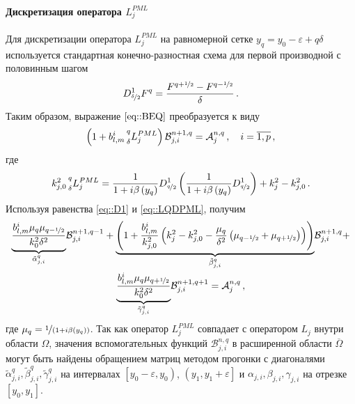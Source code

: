 \documentclass[../document.tex]{subfiles}
\begin{document}
                \paragraph{Дискретизация оператора $L_j^{PML}$}
                    \par Для дискретизации оператора $L_j^{PML}$ на равномерной сетке $y_q=y_0-\varepsilon+q\delta$ используется стандартная конечно-разностная схема для первой производной с половинным шагом
                    \begin{equation}\label{eq::D1}
                        D^1_{\nicefrac{\delta}{2}}F^q=\frac{F^{q+\nicefrac{1}{2}}-F^{q-\nicefrac{1}{2}}}{\delta}\,.
                    \end{equation}
                    Таким образом, выражение $\eqref{eq::BEQ}$ преобразуется к виду 
                    \begin{equation}
                        \left(1+b_{l,m}^i\prescript{q}{\delta}{L_j^{PML}}\right)\mathcal{B}_{j,i}^{n+1,q}=\mathcal{A}_j^{n,q}\,,\quad i=\overline{1,p}\,,
                    \end{equation}
                    где
                    \begin{equation}\label{eq::LQDPML}
                        k_{j,0}^2\prescript{q}{\delta}{L_j^{PML}}=\frac{1}{1+i\beta\left(y_q\right)}D_{\nicefrac{q}{2}}^1\left(\frac{1}{1+i\beta\left(y_q\right)}D_{\nicefrac{q}{2}}^1\right)+k_j^2-k_{j,0}^2\,.
                    \end{equation}
                    Используя равенства \eqref{eq::D1} и \eqref{eq::LQDPML}, получим
                    \begin{multline}
                        \underset{\tilde{\alpha}_{j,i}^q}{\underbrace{\frac{b_{l,m}^i\mu_q\mu_{q-\nicefrac{1}{2}}}{k_0^2\delta^2}}}\mathcal{B}_{j,i}^{n+1,q-1}+\underset{\tilde{\beta}_{j,i}^q}{\underbrace{\left(1+\frac{b_{l,m}^i}{k_{j,0}^2}\left(k_j^2-k_{j,0}^2-\frac{\mu_q}{\delta^2}\left(\mu_{q-\nicefrac{1}{2}}+\mu_{q+\nicefrac{1}{2}}\right)\right)\right)}}\mathcal{B}_{j,i}^{n+1,q}+\\\underset{\tilde{\gamma}_{j,i}^q}{\underbrace{\frac{b_{l,m}^i\mu_q\mu_{q+\nicefrac{1}{2}}}{k_0^2\delta^2}}}\mathcal{B}_{j,i}^{n+1,q+1}=\mathcal{A}_j^{n,q}\,,
                    \end{multline}
                    где $\mu_q=\nicefrac{1}{\left(1+i\beta\left(y_q\right)\right)}$. Так как оператор $L_j^{PML}$ совпадает с оператором $L_j$ внутри области $\Omega$, значения вспомогательных функций $\mathcal{B}_{j,i}^{n,q}$ в расширенной области $\overline{\Omega}$ могут быть найдены обращением матриц методом прогонки \cite{abramov} с диагоналями $\tilde{\alpha}_{j,i}^q,\tilde{\beta}_{j,i}^q,\tilde{\gamma}_{j,i}^q$ на интервалах $\left[y_0-\varepsilon,y_0\right)$, $\left(y_1,y_1+\varepsilon\right]$ и $\alpha_{j,i},\beta_{j,i},\gamma_{j,i}$ на отрезке $\left[y_0,y_1\right]$.
\end{document}

